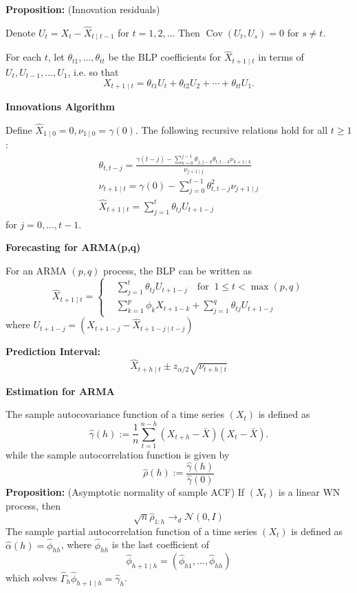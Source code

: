 \documentclass[a4paper]{article}
\newcommand{\subheading}[1]{{\scriptsize\textbf{#1}}}
\begin{document}
\begin{multicols*}{4}
\textbf{Proposition:} (Innovation residuals)

Denote $U_{t}=X_{t}-\hat{X}_{t \mid t-1}$ for $t=1,2, \ldots$ 
Then $\operatorname{Cov}\left(U_{t}, U_{s}\right)=0$ for $s \neq t$. 

For each $t$, let $\theta_{t 1}, \ldots, \theta_{t t}$ be the BLP coefficients for $\hat{X}_{t+1 \mid t}$ in terms of $U_{t}, U_{t-1}, \ldots, U_{1}$, i.e. so that
$$
X_{t+1 \mid t}=\theta_{t 1} U_{t}+\theta_{t 2} U_{2}+\cdots+\theta_{t t} U_{1} .
$$

\subheading{Innovations Algorithm}

Define $\hat{X}_{1 \mid 0}=0, \nu_{1 \mid 0}=\gamma(0)$. The following recursive relations hold for all $t \geq 1$ :
$$
\begin{gathered}
\theta_{t, t-j}=\frac{\gamma(t-j)-\sum_{k=0}^{j-1} \theta_{j, j-k} \theta_{t, t-k} \nu_{k+1 \mid k}}{\nu_{j+1 \mid j}} \\
\nu_{t+1 \mid t}=\gamma(0)-\sum_{j=0}^{t-1} \theta_{t, t-j}^{2} \nu_{j+1 \mid j} \\
\hat{X}_{t+1 \mid t}=\sum_{j=1}^{t} \theta_{t j} U_{t+1-j}
\end{gathered}
$$
for $j = 0, \dots, t-1$.

\smallskip
\hline
\smallskip

\subheading{Forecasting for ARMA(p,q)}

For an ARMA $(p, q)$ process, the BLP can be written as
$$
\hat{X}_{t+1 \mid t}= 
\left\{
\begin{aligned}
&\sum_{j=1}^{t} \theta_{t j}U_{t+1-j} \quad \text{for} \;\;  1 \leq t<\max (p, q)  \\ 
&\sum_{k=1}^{p} \phi_{k} X_{t+1-k}+ \sum_{j=1}^{q} \theta_{t j}U_{t+1-j} 
\end{aligned}
\right.
$$
where $U_{t+1-j} = \left(X_{t+1-j}-\hat{X}_{t+1-j \mid t-j}\right)$

\textbf{Prediction Interval:}
$$
\hat{X}_{t+h \mid t} \pm z_{\alpha / 2} \sqrt{\nu_{t+h \mid t}}
$$

\smallskip
\hline
\smallskip

\subheading{Estimation for ARMA}

The sample autocovariance function of a time series $\left(X_{t}\right)$ is defined as
$$
\hat{\gamma}(h):=\frac{1}{n} \sum_{t=1}^{n-h}\left(X_{t+h}-\bar{X}\right)\left(X_{t}-\bar{X}\right) .
$$
while the sample autocorrelation function is given by
$$
\hat{\rho}(h):=\frac{\hat{\gamma}(h)}{\hat{\gamma}(0)}
$$
\textbf{Proposition:} (Asymptotic normality of sample ACF) If $\left(X_{t}\right)$ is a linear WN process, then
$$
\sqrt{n} \hat{\rho}_{1: h} \rightarrow_{d} \mathcal{N}(0, I)
$$
The sample partial autocorrelation function of a time series $\left(X_{t}\right)$ is defined as $\hat{\alpha}(h)=\hat{\phi}_{h h}$, where $\hat{\phi}_{h h}$ is the last coefficient of 
$$
\hat{\phi}_{h+1 \mid h}=\left(\hat{\phi}_{h 1}, \ldots, \hat{\phi}_{h h}\right)
$$
which solves $\hat{\Gamma}_{h} \hat{\phi}_{h+1 \mid h}=\hat{\gamma}_{h}$.


\end{multicols*}
\end{document}
